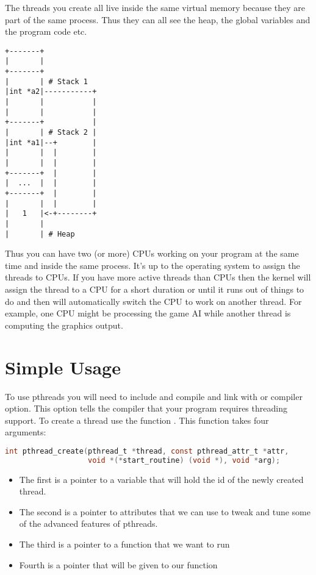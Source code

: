 The threads you create all live inside the same virtual memory because they are part of the same process.
Thus they can all see the heap, the global variables and the program code etc.

\begin{verbatim}
+-------+
|       |
+-------+
|       | # Stack 1
|int *a2|-----------+
|       |           |
|       |           |
+-------+           |
|       | # Stack 2 |
|int *a1|--+        |
|       |  |        |
|       |  |        |
+-------+  |        |
|  ...  |  |        |
+-------+  |        |
|       |  |        |
|   1   |<-+--------+
|       |
|       | # Heap
\end{verbatim}


Thus you can have two (or more) CPUs working on your program at the same time and inside the same process.
It's up to the operating system to assign the threads to CPUs.
If you have more active threads than CPUs then the kernel will assign the thread to a CPU for a short duration or until it runs out of things to do and then will automatically switch the CPU to work on another thread.
For example, one CPU might be processing the game AI while another thread is computing the graphics output.

\section{Simple Usage}

To use pthreads you will need to include  and compile and link with  or  compiler option.
This option tells the compiler that your program requires threading support.
To create a thread use the function . This function takes four arguments:

\begin{lstlisting}[language=C]
int pthread_create(pthread_t *thread, const pthread_attr_t *attr,
                   void *(*start_routine) (void *), void *arg);
\end{lstlisting}

\begin{itemize}
\tightlist
\item
  The first is a pointer to a variable that will hold the id of the newly created thread.
\item
  The second is a pointer to attributes that we can use to tweak and tune some of the advanced features of pthreads.
\item
  The third is a pointer to a function that we want to run
\item
  Fourth is a pointer that will be given to our function
\end{itemize}


